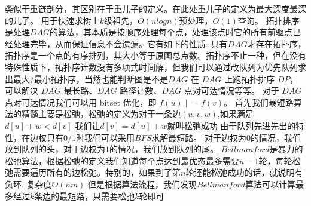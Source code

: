 \markdownRendererInterblockSeparator
{}类似于重链剖分，其区别在于重儿子的定义。在此处重儿子的定义为最大深度最深的儿子。\markdownRendererParagraphSeparator
{}用于快速求树上$ k $级祖先，$ O(nlogn) $预处理，$ O(1) $查询。\markdownRendererInterblockSeparator
{}\markdownRendererInterblockSeparator
{}
\markdownRendererSectionEnd 
\markdownRendererSectionEnd \markdownRendererSectionBegin
{}\markdownRendererInterblockSeparator
{}拓扑排序是处理$ DAG $的算法，其本质是按顺序处理每个点，处理该点时它的所有前驱点已经处理完毕，从而保证信息不会遗漏。它有如下的性质:\markdownRendererParagraphSeparator
{}只有$ DAG $才存在拓扑序，拓扑序是一个点的有序排列，其大小等于原图总点数。拓扑序不止一种，但在没有特殊性质下，拓扑序计数没有多项式时间解，但我们可以通过改队列为优先队列求出最大/最小拓扑序，当然也能判断图是不是$ DAG $\markdownRendererParagraphSeparator
{}在 $DAG$ 上跑拓扑排序 $DP$，可以解决 $DAG$ 最长路、$DAG$ 路径计数、$DAG$ 点对可达情况等等。\markdownRendererParagraphSeparator
{}对于 $DAG$ 点对可达情况我们可以用 bitset 优化，即 $f(u) \mathrel{|}= f(v)$。\markdownRendererInterblockSeparator
{}\markdownRendererInterblockSeparator
{}
\markdownRendererSectionEnd \markdownRendererSectionBegin
{}\markdownRendererInterblockSeparator
{}\markdownRendererSectionBegin
{}\markdownRendererInterblockSeparator
{}首先我们最短路算法的精髓主要是松弛，松弛的定义为对于一条边$ (u,v,w) $,如果满足$ d[u]+w<d[v] $\markdownRendererParagraphSeparator
{}我们让$ d[v]=d[u]+w $就叫松弛成功\markdownRendererInterblockSeparator
{}\markdownRendererSectionBegin
{}\markdownRendererInterblockSeparator
{}由于队列先进先出的特性，在边权只有$ 0/1 $时我们可以采用$ BFS $求解最短路。\markdownRendererParagraphSeparator
{}对于边权为$ 0 $的情况，我们放到队列的头，对于边权为$ 1 $的情况，我们放到队列的尾。\markdownRendererInterblockSeparator
{}
\markdownRendererSectionEnd \markdownRendererSectionBegin
{}\markdownRendererInterblockSeparator
{}$ Bellmanford $是暴力的松弛算法，根据松弛的定义我们知道每个点达到最优态最多需要$ n-1 $轮，每轮松弛需要遍历所有的边松弛。特别的，如果到了第$ n $轮还能松弛成功的话，就说明有负环.\markdownRendererParagraphSeparator
{}复杂度$ O(nm) $\markdownRendererParagraphSeparator
{}但是根据算法流程，我们发现$ Bellmanford $算法可以计算最多经过$ k $条边的最短路，只需要松弛$ k $轮即可\markdownRendererInterblockSeparator
